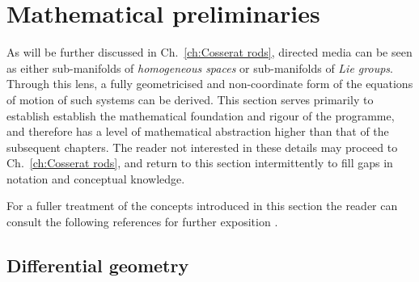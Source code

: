 



\section{Mathematical preliminaries}

As will be further discussed in Ch.~\ref{ch:Cosserat rods}, directed media can be seen as either sub-manifolds of \textit{homogeneous spaces} or sub-manifolds of \textit{Lie groups}. Through this lens, a fully geometricised and non-coordinate form of the equations of motion of such systems can be derived. This section serves primarily to establish establish the mathematical foundation and rigour of the programme, and therefore has a level of mathematical abstraction higher than that of the subsequent chapters. The reader not interested in these details may proceed to Ch.~\ref{ch:Cosserat rods}, and return to this section intermittently to fill gaps in notation and conceptual knowledge.

For a fuller treatment of the concepts introduced in this section the reader can consult the following references for further exposition \citep{clellandFrenetCartanMethod2017, kleinDevelopmentMathematics19th1979, marsdenIntroductionMechanicsSymmetry2013, marleHenriPoincareNote2013a}.

\subsection{Differential geometry}

